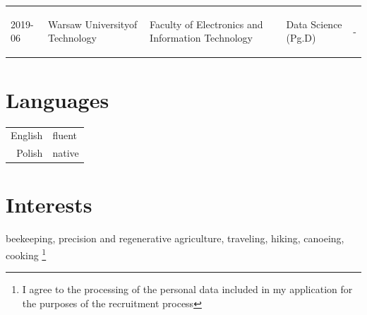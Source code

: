 \documentclass{report}
\begin{document}
\begin{tabular}{m{1.4cm} m{2.3cm} m{2.4cm} m{2.8cm} m{4.6cm}}
    \begin{center} 2019-06 \end{center}
    &\begin{center}    Warsaw University\linebreak[4] of Technology \end{center}
    &\begin{center}    Faculty of \linebreak[4] Electronics and Information Technology    \end{center}
    &\begin{center}    Data Science  (Pg.D)    \end{center}
    &\begin{center}    - \end{center}\\
    \end{tabular}

\section{Languages}
\begin{tabular}{r|l}
    English &fluent\\
    Polish &native\\
\end{tabular}

\section{Interests}
beekeeping, precision and regenerative agriculture, traveling, hiking, canoeing, cooking
\footnote{I agree to the processing of the personal data included
in my application for the purposes of the recruitment process}
\end{document}
